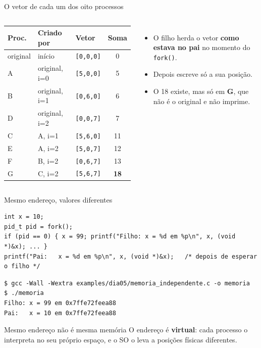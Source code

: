 \documentclass[aspectratio=169]{beamer}
\begin{document}
\begin{frame}{O vetor de cada um dos oito processos}
\begin{columns}[c]
\small
\begin{tabular}{@{}lllc@{}}
\toprule
\textbf{Proc.} & \textbf{Criado por} & \textbf{Vetor} & \textbf{Soma} \\
\midrule
original & início & \texttt{[0,0,0]} & 0 \\
A & original, i=0 & \texttt{[5,0,0]} & 5 \\
B & original, i=1 & \texttt{[0,6,0]} & 6 \\
D & original, i=2 & \texttt{[0,0,7]} & 7 \\
C & A, i=1 & \texttt{[5,6,0]} & 11 \\
E & A, i=2 & \texttt{[5,0,7]} & 12 \\
F & B, i=2 & \texttt{[0,6,7]} & 13 \\
G & C, i=2 & \texttt{[5,6,7]} & \textbf{18} \\
\bottomrule
\end{tabular}

\begin{itemize}
    \item O filho herda o vetor \textbf{como estava no pai} no momento do \texttt{fork()}.
    \item Depois escreve só a sua posição.
    \item O 18 existe, mas só em \textbf{G}, que não é o original e não imprime.
\end{itemize}
\end{columns}
\end{frame}

\begin{frame}[fragile]{Mesmo endereço, valores diferentes}
\begin{lstlisting}[style=codigo]
int x = 10;
pid_t pid = fork();
if (pid == 0) { x = 99; printf("Filho: x = %d em %p\n", x, (void *)&x); ... }
printf("Pai:   x = %d em %p\n", x, (void *)&x);   /* depois de esperar o filho */
\end{lstlisting}

\begin{lstlisting}[style=terminal]
$ gcc -Wall -Wextra examples/dia05/memoria_independente.c -o memoria
$ ./memoria
Filho: x = 99 em 0x7ffe72feea88
Pai:   x = 10 em 0x7ffe72feea88
\end{lstlisting}

\begin{alertblock}{Mesmo endereço não é mesma memória}
O endereço é \textbf{virtual}: cada processo o interpreta no seu próprio espaço, e o SO o leva a posições físicas diferentes.
\end{alertblock}
\end{frame}
\end{document}
